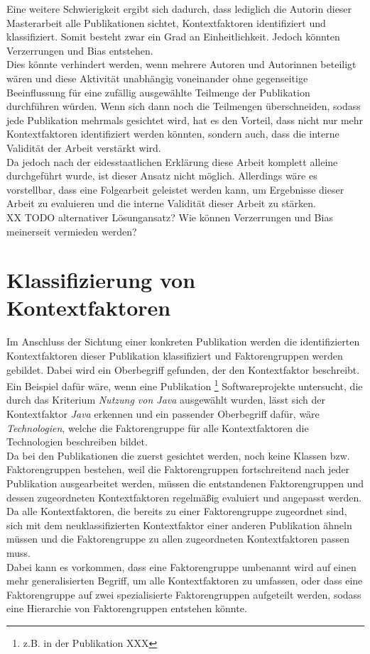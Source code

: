 Eine weitere Schwierigkeit ergibt sich dadurch, dass lediglich die Autorin dieser Masterarbeit alle Publikationen sichtet, Kontextfaktoren identifiziert und klassifiziert. Somit besteht zwar ein Grad an Einheitlichkeit. Jedoch könnten Verzerrungen und Bias entstehen. \\
Dies könnte verhindert werden, wenn mehrere Autoren und Autorinnen beteiligt wären und diese Aktivität unabhängig voneinander ohne gegenseitige Beeinflussung für eine zufällig ausgewählte Teilmenge der Publikation durchführen würden. Wenn sich dann noch die Teilmengen überschneiden, sodass jede Publikation mehrmals gesichtet wird, hat es den Vorteil, dass nicht nur mehr Kontextfaktoren identifiziert werden könnten, sondern auch, dass die interne Validität der Arbeit verstärkt wird. \\
Da jedoch nach der eidesstaatlichen Erklärung diese Arbeit komplett alleine durchgeführt wurde, ist dieser Ansatz nicht möglich. Allerdings wäre es vorstellbar, dass eine Folgearbeit geleistet werden kann, um Ergebnisse dieser Arbeit zu evaluieren und die interne Validität dieser Arbeit zu stärken. \\

XX TODO alternativer Lösungansatz? Wie können Verzerrungen und Bias meinerseit vermieden werden? \\

\section{Klassifizierung von Kontextfaktoren}
\label{sec:class-context}
Im Anschluss der Sichtung einer konkreten Publikation werden die identifizierten Kontextfaktoren dieser Publikation klassifiziert und Faktorengruppen werden gebildet. Dabei wird ein Oberbegriff gefunden, der den Kontextfaktor beschreibt. Ein Beispiel dafür wäre, wenn eine Publikation \footnote{z.B. in der Publikation XXX} Softwareprojekte untersucht, die durch das Kriterium \textit{Nutzung von Java} ausgewählt wurden, lässt sich der Kontextfaktor \textit{Java} erkennen und ein passender Oberbegriff dafür, wäre \textit{Technologien}, welche die Faktorengruppe für alle Kontextfaktoren die Technologien beschreiben bildet. \\

Da bei den Publikationen die zuerst gesichtet werden, noch keine Klassen bzw. Faktorengruppen bestehen, weil die Faktorengruppen fortschreitend nach jeder Publikation ausgearbeitet werden, müssen die entstandenen Faktorengruppen und dessen zugeordneten Kontextfaktoren regelmäßig evaluiert und angepasst werden. Da alle Kontextfaktoren, die bereits zu einer Faktorengruppe zugeordnet sind, sich mit dem neuklassifizierten Kontextfaktor einer anderen Publikation ähneln müssen und die Faktorengruppe zu allen zugeordneten Kontextfaktoren passen muss. \\
Dabei kann es vorkommen, dass eine Faktorengruppe umbenannt wird auf einen mehr generalisierten Begriff, um alle Kontextfaktoren zu umfassen, oder dass eine Faktorengruppe auf zwei spezialisierte Faktorengruppen aufgeteilt werden, sodass eine Hierarchie von Faktorengruppen entstehen könnte. \\

